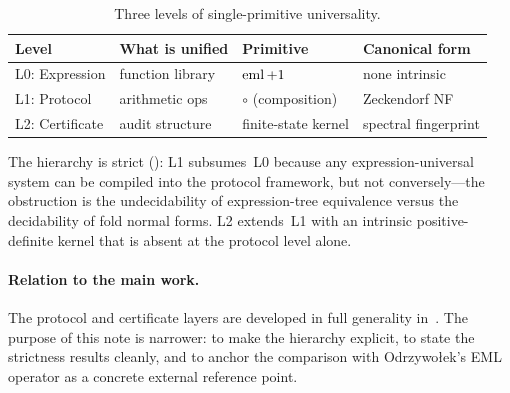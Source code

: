 \begin{table}[ht]
\centering\small
\caption{Three levels of single-primitive universality.}
\label{tab:hierarchy}
\begin{tabular}{@{}llll@{}}
\toprule
Level & What is unified & Primitive & Canonical form \\
\midrule
L0: Expression  & function library  & $\operatorname{eml} + 1$  & none intrinsic \\
L1: Protocol    & arithmetic ops    & $\circ$ (composition) & Zeckendorf NF \\
L2: Certificate & audit structure   & finite-state kernel & spectral fingerprint \\
\bottomrule
\end{tabular}
\end{table}

The hierarchy is strict ():
L1 subsumes~L0 because any expression-universal system can be
compiled into the protocol framework, but not conversely---the
obstruction is the undecidability of expression-tree equivalence
versus the decidability of fold normal forms.
L2 extends~L1 with an intrinsic positive-definite kernel that
is absent at the protocol level alone.

\paragraph{Relation to the main work.}
The protocol and certificate layers are developed in full
generality in~\cite{OmegaSPG2026}.  The purpose of this note is
narrower: to make the hierarchy explicit, to state the strictness
results cleanly, and to anchor the comparison with Odrzywołek's
EML operator as a concrete external reference point.
